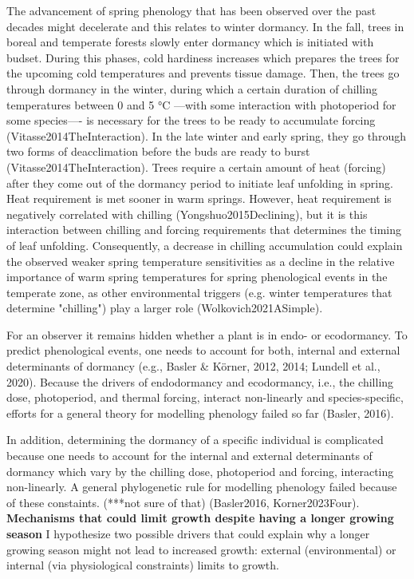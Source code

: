 \documentclass{article}
\begin{document}
The advancement of spring phenology that has been observed over the past decades might decelerate and this relates to winter dormancy. In the fall, trees in boreal and temperate forests slowly enter dormancy which is initiated with budset. During this phases, cold hardiness increases which prepares the trees for the upcoming cold temperatures and prevents tissue damage. Then, the trees go through dormancy in the winter, during which a certain duration of chilling temperatures between 0 and 5 °C ---with some interaction with photoperiod for some species---- is necessary for the trees to be ready to accumulate forcing (Vitasse2014TheInteraction). In the late winter and early spring, they go through two forms of deacclimation before the buds are ready to burst (Vitasse2014TheInteraction). Trees require a certain amount of heat (forcing) after they come out of the dormancy period to initiate leaf unfolding in spring. Heat requirement is met sooner in warm springs. However, heat requirement is negatively correlated with chilling (Yongshuo2015Declining), but it is this interaction between chilling and forcing requirements that determines the timing of leaf unfolding. Consequently, a decrease in chilling accumulation could explain the observed weaker spring temperature sensitivities as a decline in the relative importance of warm spring temperatures for spring phenological events in the temperate zone, as other environmental triggers (e.g. winter temperatures that determine "chilling") play a larger role (Wolkovich2021ASimple). 


For an observer it remains hidden whether a plant is in endo- or ecodormancy. To predict phenological events, one needs to account for both, internal and external determinants of dormancy (e.g., Basler & Körner, 2012, 2014; Lundell et al., 2020). Because the drivers of endodormancy and ecodormancy, i.e., the chilling dose, photoperiod, and thermal forcing, interact non-linearly and species-specific, efforts for a general theory for modelling phenology failed so far (Basler, 2016).

In addition, determining the dormancy of a specific individual is complicated because one needs to account for the internal and external determinants of dormancy which vary by the chilling dose, photoperiod and forcing, interacting non-linearly. A general phylogenetic rule for modelling phenology failed because of these constaints. (***not sure of that) (Basler2016, Korner2023Four).
\textbf{Mechanisms that could limit growth despite having a longer growing season}
I hypothesize two possible drivers that could explain why a longer growing season might not lead to increased growth: external (environmental) \cite{kolar_response_2016} or internal (via physiological constraints)\cite{zohner_effect_2023} limits to growth. 
\end{document}
